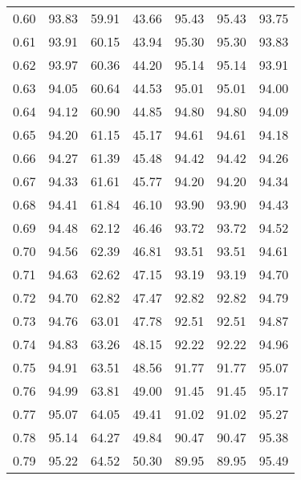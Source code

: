 \begin{tabular}{|c|c|c|c|c|c|c|}
      0.60 &     93.83 &     59.91 &      43.66 &   95.43 &      95.43 &         93.75 \\
      0.61 &     93.91 &     60.15 &      43.94 &   95.30 &      95.30 &         93.83 \\
      0.62 &     93.97 &     60.36 &      44.20 &   95.14 &      95.14 &         93.91 \\
      0.63 &     94.05 &     60.64 &      44.53 &   95.01 &      95.01 &         94.00 \\
      0.64 &     94.12 &     60.90 &      44.85 &   94.80 &      94.80 &         94.09 \\
      0.65 &     94.20 &     61.15 &      45.17 &   94.61 &      94.61 &         94.18 \\
      0.66 &     94.27 &     61.39 &      45.48 &   94.42 &      94.42 &         94.26 \\
      0.67 &     94.33 &     61.61 &      45.77 &   94.20 &      94.20 &         94.34 \\
      0.68 &     94.41 &     61.84 &      46.10 &   93.90 &      93.90 &         94.43 \\
      0.69 &     94.48 &     62.12 &      46.46 &   93.72 &      93.72 &         94.52 \\
      0.70 &     94.56 &     62.39 &      46.81 &   93.51 &      93.51 &         94.61 \\
      0.71 &     94.63 &     62.62 &      47.15 &   93.19 &      93.19 &         94.70 \\
      0.72 &     94.70 &     62.82 &      47.47 &   92.82 &      92.82 &         94.79 \\
      0.73 &     94.76 &     63.01 &      47.78 &   92.51 &      92.51 &         94.87 \\
      0.74 &     94.83 &     63.26 &      48.15 &   92.22 &      92.22 &         94.96 \\
      0.75 &     94.91 &     63.51 &      48.56 &   91.77 &      91.77 &         95.07 \\
      0.76 &     94.99 &     63.81 &      49.00 &   91.45 &      91.45 &         95.17 \\
      0.77 &     95.07 &     64.05 &      49.41 &   91.02 &      91.02 &         95.27 \\
      0.78 &     95.14 &     64.27 &      49.84 &   90.47 &      90.47 &         95.38 \\
      0.79 &     95.22 &     64.52 &      50.30 &   89.95 &      89.95 &         95.49 \\

\end{tabular}
